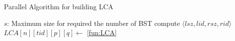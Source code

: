 \begin{algorithm}[!thb]
  \caption{Parallel Algorithm for building LCA}
  \label{alg:parallel-LCA}
  \begin{algorithmic}[1]
    \Require
      $s$: Maximum size for required the number of BST
          \State compute $\langle\mathit{lsz},\mathit{lid},\mathit{rsz},\mathit{rid}\rangle$
            \State $\textit{LCA}[n][\mathit{tid}][p][q] \gets$ \ref{fun:LCA}
          \EndFor
        \EndParFor
      \EndParFor
    \EndFor
  \end{algorithmic}
\end{algorithm}